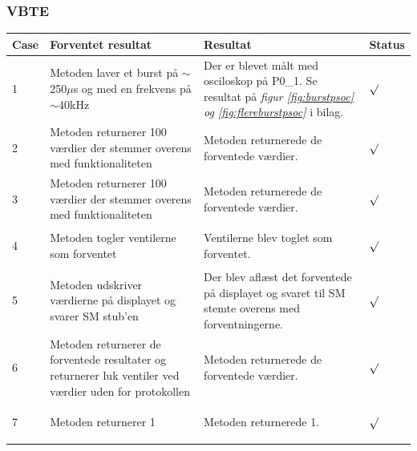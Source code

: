 \subsubsection{VBTE}
\begin{table}[H]
\centering
\begin{tabular}{| p{1cm}  | p{4cm} | p{6cm} | p{1cm} |}
\hline
Case &Forventet resultat &Resultat &Status\\\hline
1 &Metoden laver et burst på $\sim$250$\mu$s og med en frekvens på $\sim$40kHz & Der er blevet målt med osciloskop på P0\_1. Se resultat på \textit{figur \ref{fig:burstpsoc} og \ref{fig:flereburstpsoc}} i bilag. &\begin{Huge}$\surd$\end{Huge} \\\hline 
2 &Metoden returnerer 100 værdier der stemmer overens med funktionaliteten & Metoden returnerede de forventede værdier. &\begin{Huge}$\surd$\end{Huge} \\\hline 
3 &Metoden returnerer 100 værdier der stemmer overens med funktionaliteten & Metoden returnerede de forventede værdier. &\begin{Huge}$\surd$\end{Huge} \\\hline 
4 &Metoden togler ventilerne som forventet & Ventilerne blev toglet som forventet. &\begin{Huge}$\surd$\end{Huge} \\\hline 
5 &Metoden udskriver værdierne på displayet og svarer SM stub'en & Der blev aflæst det forventede på displayet og svaret til SM stemte overens med forventningerne. &\begin{Huge}$\surd$\end{Huge} \\\hline 
6 &Metoden returnerer de forventede resultater og returnerer luk ventiler ved værdier uden for protokollen& Metoden returnerede de forventede værdier. &\begin{Huge}$\surd$\end{Huge} \\\hline
7 &Metoden returnerer 1 & Metoden returnerede 1. &\begin{Huge}$\surd$\end{Huge} \\\hline  
\end{tabular}
\end{table}
